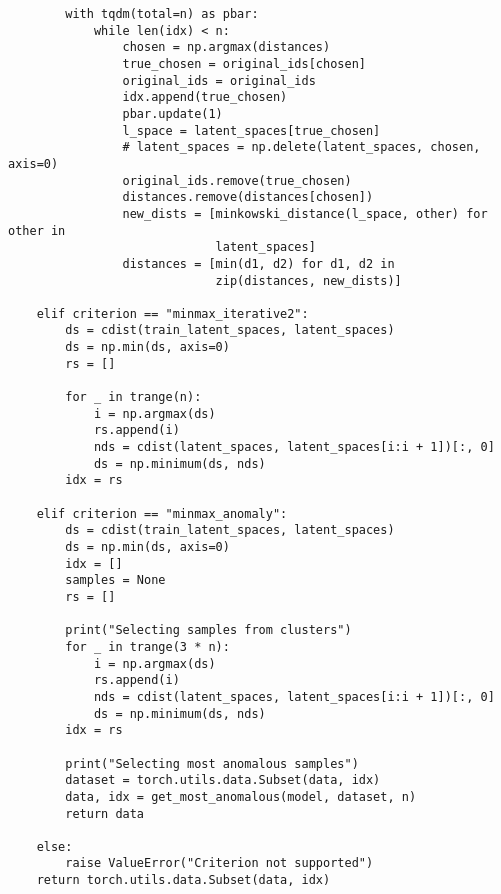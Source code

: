 \begin{lstlisting}
        with tqdm(total=n) as pbar:
            while len(idx) < n:
                chosen = np.argmax(distances)
                true_chosen = original_ids[chosen]
                original_ids = original_ids
                idx.append(true_chosen)
                pbar.update(1)
                l_space = latent_spaces[true_chosen]
                # latent_spaces = np.delete(latent_spaces, chosen, axis=0)
                original_ids.remove(true_chosen)
                distances.remove(distances[chosen])
                new_dists = [minkowski_distance(l_space, other) for other in
                             latent_spaces]
                distances = [min(d1, d2) for d1, d2 in
                             zip(distances, new_dists)]

    elif criterion == "minmax_iterative2":
        ds = cdist(train_latent_spaces, latent_spaces)
        ds = np.min(ds, axis=0)
        rs = []

        for _ in trange(n):
            i = np.argmax(ds)
            rs.append(i)
            nds = cdist(latent_spaces, latent_spaces[i:i + 1])[:, 0]
            ds = np.minimum(ds, nds)
        idx = rs

    elif criterion == "minmax_anomaly":
        ds = cdist(train_latent_spaces, latent_spaces)
        ds = np.min(ds, axis=0)
        idx = []
        samples = None
        rs = []

        print("Selecting samples from clusters")
        for _ in trange(3 * n):
            i = np.argmax(ds)
            rs.append(i)
            nds = cdist(latent_spaces, latent_spaces[i:i + 1])[:, 0]
            ds = np.minimum(ds, nds)
        idx = rs

        print("Selecting most anomalous samples")
        dataset = torch.utils.data.Subset(data, idx)
        data, idx = get_most_anomalous(model, dataset, n)
        return data

    else:
        raise ValueError("Criterion not supported")
    return torch.utils.data.Subset(data, idx)
\end{lstlisting}